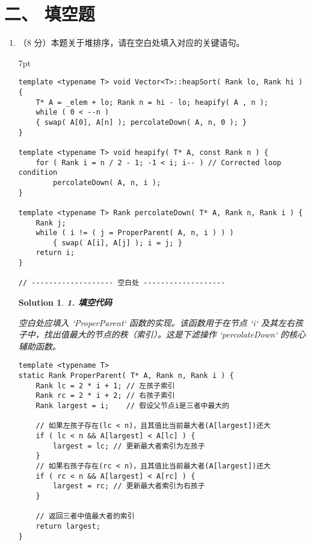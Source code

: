 \documentclass[UTF8]{report}
\newtheorem{solution}{Solution}
\theoremstyle{MyLineTheoremStyle} %
\theoremstyle{MyBlockTheoremStyle} %
\theoremstyle{MySubsubsectionStyle} %
\newenvironment{graybox}{%
        \def\FrameCommand{%
        \hspace{1pt}%
        {\color{gray}\small \vrule width 2pt}%
        {\color{graybox_color}\vrule width 4pt}%
        \colorbox{graybox_color}%
        }%
        \MakeFramed{\advance\hsize-\width\FrameRestore}%
        \noindent\hspace{-4.55pt}%
        \begin{adjustwidth}{}{7pt}%
        \vspace{2pt}\vspace{2pt}%
        }
        {%
        \vspace{2pt}\end{adjustwidth}\endMakeFramed%
        }
\begin{document}
\section*{二、 填空题}

\begin{enumerate}
    \item （8 分）本题关于堆排序，请在空白处填入对应的关键语句。
    \begin{graybox}
\begin{verbatim}
template <typename T> void Vector<T>::heapSort( Rank lo, Rank hi ) {
    T* A = _elem + lo; Rank n = hi - lo; heapify( A , n );
    while ( 0 < --n )
    { swap( A[0], A[n] ); percolateDown( A, n, 0 ); }
}

template <typename T> void heapify( T* A, const Rank n ) {
    for ( Rank i = n / 2 - 1; -1 < i; i-- ) // Corrected loop condition
        percolateDown( A, n, i );
}

template <typename T> Rank percolateDown( T* A, Rank n, Rank i ) {
    Rank j;
    while ( i != ( j = ProperParent( A, n, i ) ) )
        { swap( A[i], A[j] ); i = j; }
    return i;
}

// ------------------- 空白处 -------------------

\end{verbatim}
    \end{graybox}

    \begin{solution}
    \textbf{1. 填空代码}
    
    空白处应填入 `ProperParent` 函数的实现。该函数用于在节点 `i` 及其左右孩子中，找出值最大的节点的秩（索引）。这是下滤操作 `percolateDown` 的核心辅助函数。
    
    \begin{lstlisting}[style=cppstyle]
template <typename T> 
static Rank ProperParent( T* A, Rank n, Rank i ) {
    Rank lc = 2 * i + 1; // 左孩子索引
    Rank rc = 2 * i + 2; // 右孩子索引
    Rank largest = i;    // 假设父节点i是三者中最大的

    // 如果左孩子存在(lc < n)，且其值比当前最大者(A[largest])还大
    if ( lc < n && A[largest] < A[lc] ) {
        largest = lc; // 更新最大者索引为左孩子
    }
    // 如果右孩子存在(rc < n)，且其值比当前最大者(A[largest])还大
    if ( rc < n && A[largest] < A[rc] ) {
        largest = rc; // 更新最大者索引为右孩子
    }
    
    // 返回三者中值最大者的索引
    return largest;
}
    \end{lstlisting}


\end{solution}
\end{enumerate}
\end{document}
